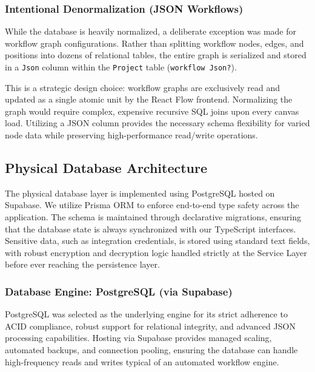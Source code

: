 \subsubsection{Intentional Denormalization (JSON Workflows)}
While the database is heavily normalized, a deliberate exception was made for workflow graph configurations. Rather than splitting workflow nodes, edges, and positions into dozens of relational tables, the entire graph is serialized and stored in a \texttt{Json} column within the \texttt{Project} table (\texttt{workflow Json?}). 

This is a strategic design choice: workflow graphs are exclusively read and updated as a single atomic unit by the React Flow frontend. Normalizing the graph would require complex, expensive recursive SQL joins upon every canvas load. Utilizing a JSON column provides the necessary schema flexibility for varied node data while preserving high-performance read/write operations.

\subsection{Physical Database Architecture}

The physical database layer is implemented using PostgreSQL hosted on Supabase. We utilize Prisma ORM to enforce end-to-end type safety across the application. The schema is maintained through declarative migrations, ensuring that the database state is always synchronized with our TypeScript interfaces. Sensitive data, such as integration credentials, is stored using standard text fields, with robust encryption and decryption logic handled strictly at the Service Layer before ever reaching the persistence layer.

\subsubsection{Database Engine: PostgreSQL (via Supabase)}
PostgreSQL was selected as the underlying engine for its strict adherence to ACID compliance, robust support for relational integrity, and advanced JSON processing capabilities. Hosting via Supabase provides managed scaling, automated backups, and connection pooling, ensuring the database can handle high-frequency reads and writes typical of an automated workflow engine.

